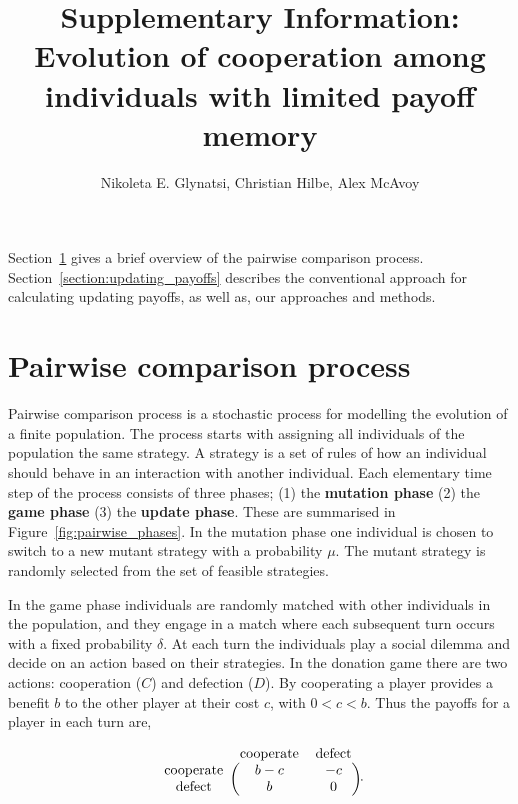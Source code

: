 \documentclass[11pt]{article}
\title{\bf  \sffamily \LARGE Supplementary Information: Evolution of cooperation among individuals with
limited payoff memory\\}
\date{}
\author{Nikoleta E. Glynatsi, Christian Hilbe, Alex McAvoy}
\theoremstyle{plainCl1}
\theoremstyle{plainCl2}
\begin{document}
\maketitle

Section~\ref{section:pairwise_comparison} gives a brief overview of the pairwise
comparison process. Section~\ref{section:updating_payoffs} describes the
conventional approach for calculating updating payoffs, as well as, our
approaches and methods.

\section{Pairwise comparison process}\label{section:pairwise_comparison}

Pairwise comparison process is a stochastic process for modelling the evolution
of a finite population. The process starts with assigning all individuals of the
population the same strategy. A strategy is a set of rules of how an individual
should behave in an interaction with another individual. Each elementary time
step of the process consists of three phases; (1) the \textbf{mutation phase}
(2) the \textbf{game phase} (3) the \textbf{update phase}. These are summarised
in Figure~\ref{fig:pairwise_phases}. In the mutation phase one individual is
chosen to switch to a new mutant strategy with a probability \(\mu\). The mutant
strategy is randomly selected from the set of feasible strategies.

In the game phase individuals are randomly matched with other individuals in the
population, and they engage in a match where each subsequent turn occurs with a
fixed probability \(\delta\). At each turn the individuals play a social dilemma
and decide on an action based on their strategies. In the donation game there
are two actions: cooperation (\(C\)) and defection (\(D\)). By cooperating a player
provides a benefit \(b\) to the other player at their cost \(c\), with \(0 < c <
b\). Thus the payoffs for a player in each turn are,

\begin{equation}
    \begin{blockarray}{ccc}
        & \text{cooperate} & \text{defect} \\
        \begin{block}{c(cc)}
            \text{cooperate} & b - c & -c \\
            \text{defect} & b & 0 \\
        \end{block}
    \end{blockarray}.
\end{equation}
\end{document}
